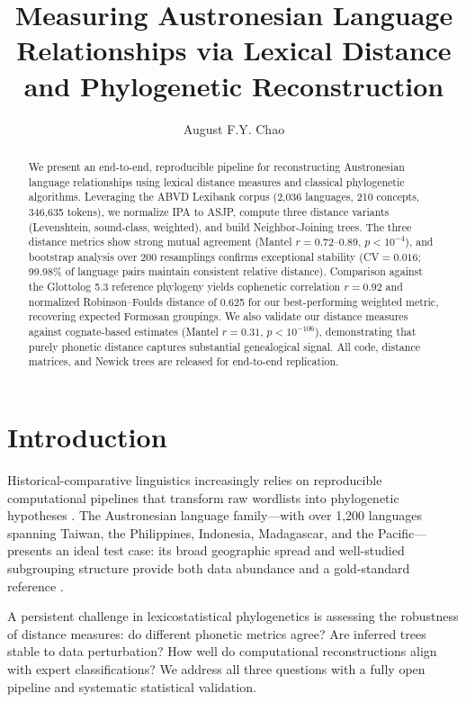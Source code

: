 \documentclass[manuscript]{clv2025}
\title{Measuring Austronesian Language Relationships via Lexical Distance and Phylogenetic Reconstruction}
\author{August F.Y. Chao}
\affil{Department of Computer Science and Information Engineering, National Penghu University of Science and Technology, Taiwan\quad \email{augchao@gms.npu.edu.tw}}
\begin{document}
\maketitle

\begin{abstract}
We present an end-to-end, reproducible pipeline for reconstructing Austronesian language relationships using lexical distance measures and classical phylogenetic algorithms. Leveraging the ABVD Lexibank corpus (2{,}036 languages, 210 concepts, 346{,}635 tokens), we normalize IPA to ASJP, compute three distance variants (Levenshtein, sound-class, weighted), and build Neighbor-Joining trees. The three distance metrics show strong mutual agreement (Mantel $r = 0.72$--$0.89$, $p < 10^{-4}$), and bootstrap analysis over 200 resamplings confirms exceptional stability (CV$= 0.016$; 99.98\% of language pairs maintain consistent relative distance). Comparison against the Glottolog 5.3 reference phylogeny yields cophenetic correlation $r = 0.92$ and normalized Robinson--Foulds distance of 0.625 for our best-performing weighted metric, recovering expected Formosan groupings. We also validate our distance measures against cognate-based estimates (Mantel $r = 0.31$, $p < 10^{-106}$), demonstrating that purely phonetic distance captures substantial genealogical signal. All code, distance matrices, and Newick trees are released for end-to-end replication.
\end{abstract}


\section{Introduction}
\label{sec:intro}

Historical-comparative linguistics increasingly relies on reproducible computational pipelines that transform raw wordlists into phylogenetic hypotheses \cite{gray2009pnas,greenhill2008abvd}. The Austronesian language family---with over 1{,}200 languages spanning Taiwan, the Philippines, Indonesia, Madagascar, and the Pacific---presents an ideal test case: its broad geographic spread and well-studied subgrouping structure provide both data abundance and a gold-standard reference \cite{blust2013austronesian,hammarstrom_glottolog4}.

A persistent challenge in lexicostatistical phylogenetics is assessing the robustness of distance measures: do different phonetic metrics agree? Are inferred trees stable to data perturbation? How well do computational reconstructions align with expert classifications? We address all three questions with a fully open pipeline and systematic statistical validation.
\end{document}
